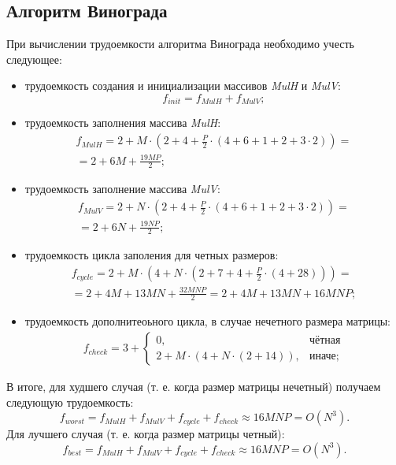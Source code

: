 \subsection*{Алгоритм Винограда}
При вычислении трудоемкости алгоритма Винограда необходимо учесть следующее:
\begin{itemize}
	\item трудоемкость создания и инициализации массивов \textit{MulH} и \textit{MulV}:
	\begin{equation}
		f_{init} = f_{MulH} + f_{MulV};
	\end{equation}
	\item трудоемкость заполнения массива \textit{MulH}:
	\begin{equation}
		\begin{gathered}
		f_{MulH} = 2 + M \cdot (2 + 4 + \frac{P}{2} \cdot (4 + 6 + 1 + 2 + 3 \cdot 2)) = \\
		= 2 + 6M + \frac{19MP}{2};
		\end{gathered}
	\end{equation}
	\item трудоемкость заполнение массива \textit{MulV}:
	\begin{equation}
		\begin{gathered}
		f_{MulV} = 2 + N \cdot (2 + 4 + \frac{P}{2} \cdot (4 + 6 + 1 + 2 + 3 \cdot 2)) = \\
		= 2 + 6N + \frac{19NP}{2};
		\end{gathered}
	\end{equation}
	\item трудоемкость цикла заполения для четных размеров:
	\begin{equation}
		\begin{gathered}
			f_{cycle} = 2 + M \cdot (4 + N \cdot (2 + 7 + 4 + \frac{P}{2} \cdot (4 + 28))) = \\
			= 2 + 4M + 13MN + \frac{32MNP}{2}  = 2 + 4M + 13MN + 16MNP;
		\end{gathered}
	\end{equation}
	\item трудоемкость дополнитеоьного цикла, в случае нечетного размера матрицы:
	\begin{equation}
		\begin{gathered}
			f_{check} = 3 + 
			\begin{cases}
				0, & \text{чётная} \\
				2 + M \cdot (4 + N \cdot (2 + 14)), & \text{иначе};
			\end{cases}
		\end{gathered}  
	\end{equation}
\end{itemize}
В итоге, для худшего случая (т. е. когда размер матрицы нечетный) получаем следующую трудоемкость:
\begin{equation}
	f_{worst} = f_{MulH} + f_{MulV} + f_{cycle} + f_{check} \approx 16MNP = O(N^3).
\end{equation}
Для лучшего случая (т. е. когда размер матрицы четный):
\begin{equation}
	f_{best} = f_{MulH} + f_{MulV} + f_{cycle} + f_{check} \approx 16MNP = O(N^3).
\end{equation}

